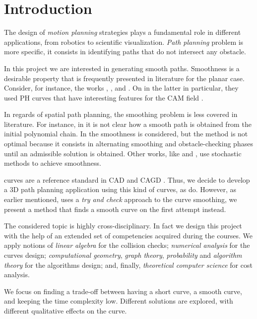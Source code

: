 \documentclass[dissertation.tex]{subfiles}
\begin{document}
\chapter{Introduction}
The design of \emph{motion planning} strategies plays a fundamental
role in different applications, from robotics to scientific
visualization. \emph{Path planning} problem is
more specific, it consists in identifying paths that do not
intersect any obstacle.

In this project we are interested in generating smooth
paths. Smoothness is a desirable property that is
frequently presented in literature for the planar case. Consider, for
instance, the works \cite{maekawa}, \cite{ho-liu}, \cite{li} and
\cite{giannelli}. On in the latter in particular, they used
\acf{PH} curves that have interesting features for the \acf{CAM} field
\cite{farouki}.

In regards of spatial path planning, the smoothing problem is less
covered in literature. For instance, in \cite{hrabar} it is not clear
how a smooth path is obtained from the initial polynomial chain. In
\cite{yang} the smoothness is considered, but the method is not
optimal because it consists in alternating smoothing and
obstacle-checking phases until an admissible solution is
obtained. Other works, like \cite{aghababa} and \cite{kroumov}, use 
stochastic methods to achieve smoothness.

\bs curves are a reference standard in \ac{CAD} and \ac{CAGD}
\cite{hughes}\cite{foley}\cite{farin}\cite{farin2}. Thus, we decide to
develop a 3D path planning application using this kind of curves, as
\cite{yang} do. However, as earlier mentioned,
\cite{yang} uses a \emph{try and check} approach to the curve
smoothing, we present a method that finds a smooth
curve on the first 
attempt instead.

The considered topic is highly cross-disciplinary. In fact we design
this project with the help of an extended set of
competencies acquired during the courses. We apply notions of
\emph{linear algebra} for the collision checks; \emph{numerical
  analysis} for the curves design; \emph{computational
  geometry},
\emph{graph theory}, \emph{probability} and \emph{algorithm theory}
for the algorithms design; and, finally, \emph{theoretical computer
  science} for cost analysis.

We focus on finding a trade-off between having a short curve, a
smooth curve, and keeping the time complexity low.
Different solutions are explored, with different qualitative effects
on the curve.
\end{document}
